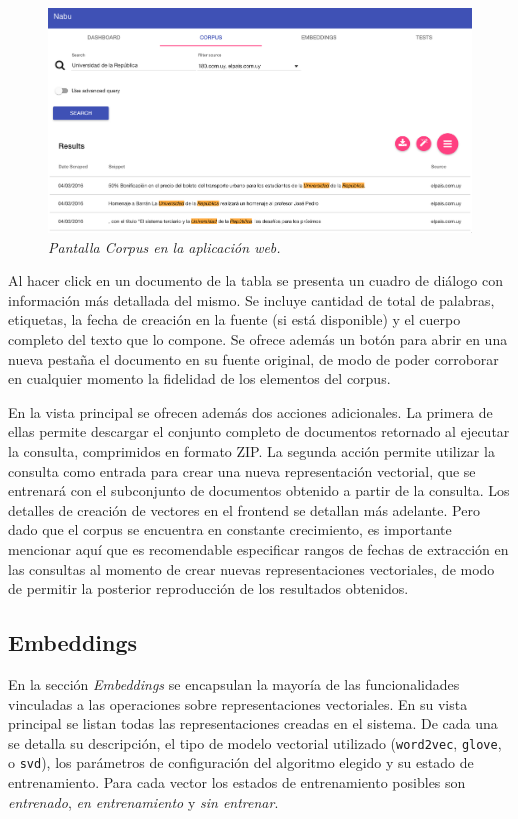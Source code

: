 \begin{figure}[h]
    \centering
    \includegraphics[width=\textwidth]{images/ui-nabu-corpus}
    \caption{\textit{Pantalla Corpus en la aplicación web.}}
    \label{fig:ui-nabu-corpus}
\end{figure}

Al hacer click en un documento de la tabla se presenta un cuadro de diálogo con información más detallada
del mismo. Se incluye cantidad de total de palabras, etiquetas, la fecha de creación en la fuente (si está
disponible) y el cuerpo completo del texto que lo compone. Se ofrece además un botón para abrir en una
nueva pestaña el documento en su fuente original, de modo de poder corroborar en cualquier momento la
fidelidad de los elementos del corpus.

En la vista principal se ofrecen además dos acciones adicionales. La primera de ellas permite descargar el
conjunto completo de documentos retornado al ejecutar la consulta, comprimidos en formato ZIP. La segunda
acción permite utilizar la consulta como entrada para crear una nueva representación vectorial, que se
entrenará con el subconjunto de documentos obtenido a partir de la consulta. Los detalles de creación de
vectores en el frontend se detallan más adelante. Pero dado que el corpus se encuentra en constante
crecimiento, es importante mencionar aquí que es recomendable especificar rangos de fechas de extracción en
las consultas al momento de crear nuevas representaciones vectoriales, de modo de permitir la posterior
reproducción de los resultados obtenidos.

\subsection{Embeddings}

En la sección \textit{Embeddings} se encapsulan la mayoría de las funcionalidades vinculadas a las
operaciones sobre representaciones vectoriales. En su vista principal se listan todas las representaciones
creadas en el sistema. De cada una se detalla su descripción, el tipo de modelo vectorial utilizado
(\texttt{word2vec}, \texttt{glove}, o \texttt{svd}), los parámetros de configuración del algoritmo elegido y
su estado de entrenamiento. Para cada vector los estados de entrenamiento posibles son \textit{entrenado},
\textit{en entrenamiento} y \textit{sin entrenar}.

